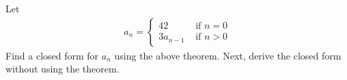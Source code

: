 Let 
\begin{align*}
a_n = 
\begin{cases}
42 & \text{ if } n = 0 \\
3a_{n-1} & \text{ if } n > 0
\end{cases}
\end{align*}
Find a closed form for $a_n$ using the above theorem.
Next, derive the closed form without using the theorem.
